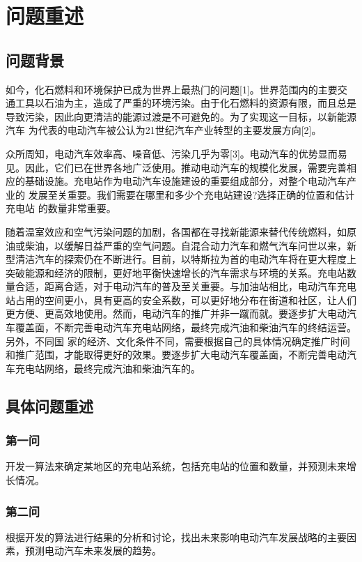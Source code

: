\documentclass[12pt, a4paper, oneside]{ctexart}
\begin{document}
    \begin{abstract}
        
    \end{abstract}
\newpage
    \section{问题重述}
    \subsection{问题背景}
    如今，化石燃料和环境保护已成为世界上最热⻔的问题[1]。世界范围内的主要交 通工具以石油为主，造成了严重的环境污染。由于化石燃料的资源有限，而且总是导致污染，因此向更清洁的能源过渡是不可避免的。为了实现这一目标，以新能源汽⻋ 为代表的电动汽⻋被公认为21世纪汽⻋产业转型的主要发展方向[2]。

    众所周知，电动汽⻋效率高、噪音低、污染几乎为零[3]。电动汽⻋的优势显而易 ⻅。因此，它们已在世界各地广泛使用。推动电动汽⻋的规模化发展，需要完善相应的基础设施。充电站作为电动汽⻋设施建设的重要组成部分，对整个电动汽⻋产业的 发展至关重要。我们需要在哪里和多少个充电站建设?选择正确的位置和估计充电站 的数量非常重要。

    随着温室效应和空气污染问题的加剧，各国都在寻找新能源来替代传统燃料，如原油或柴油，以缓解日益严重的空气问题。自混合动力汽⻋和燃气汽⻋问世以来，新型清洁汽⻋的探索仍在不断进行。目前，以特斯拉为首的电动汽⻋将在更大程度上突破能源和经济的限制，更好地平衡快速增⻓的汽⻋需求与环境的关系。充电站数量合适，距离合适，对于电动汽⻋的普及至关重要。与加油站相比，电动汽⻋充电站占用的空间更小，具有更高的安全系数，可以更好地分布在街道和社区，让人们更方便、更高效地使用。然而，电动汽⻋的推广并非一蹴而就。要逐步扩大电动汽⻋覆盖面，不断完善电动汽⻋充电站网络，最终完成汽油和柴油汽⻋的终结运营。另外，不同国 家的经济、文化条件不同，需要根据自己的具体情况确定推广时间和推广范围，才能取得更好的效果。要逐步扩大电动汽⻋覆盖面，不断完善电动汽⻋充电站网络，最终完成汽油和柴油汽⻋的。
    \subsection{具体问题重述}
    \subsubsection{第一问}
    开发一算法来确定某地区的充电站系统，包括充电站的位置和数量，并预测未来增长情况。

    \subsubsection{第二问}
    根据开发的算法进行结果的分析和讨论，找出未来影响电动汽车发展战略的主要因素，预测电动汽车未来发展的趋势。
\end{document}
